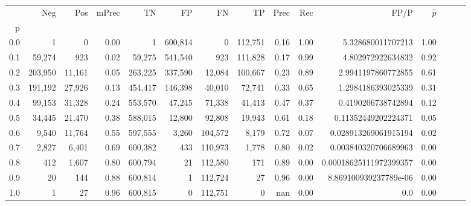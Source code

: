 \begin{tabular}{rrrrrrrrrrrrrrr}
\toprule
{} &      Neg &     Pos & mPrec &       TN &       FP &       FN &       TP &  Prec &   Rec &                    FP/P & $\hat{p}$ \\
p   &          &         &       &          &          &          &          &       &       &                         &           \\
\midrule
0.0 &        1 &       0 &  0.00 &        1 &  600,814 &        0 &  112,751 &  0.16 &  1.00 &       5.328680011707213 &      1.00 \\
0.1 &   59,274 &     923 &  0.02 &   59,275 &  541,540 &      923 &  111,828 &  0.17 &  0.99 &       4.802972922634832 &      0.92 \\
0.2 &  203,950 &  11,161 &  0.05 &  263,225 &  337,590 &   12,084 &  100,667 &  0.23 &  0.89 &      2.9941197860772855 &      0.61 \\
0.3 &  191,192 &  27,926 &  0.13 &  454,417 &  146,398 &   40,010 &   72,741 &  0.33 &  0.65 &      1.2984186393025339 &      0.31 \\
0.4 &   99,153 &  31,328 &  0.24 &  553,570 &   47,245 &   71,338 &   41,413 &  0.47 &  0.37 &      0.4190206738742894 &      0.12 \\
0.5 &   34,445 &  21,470 &  0.38 &  588,015 &   12,800 &   92,808 &   19,943 &  0.61 &  0.18 &     0.11352449202224371 &      0.05 \\
0.6 &    9,540 &  11,764 &  0.55 &  597,555 &    3,260 &  104,572 &    8,179 &  0.72 &  0.07 &    0.028913269061915194 &      0.02 \\
0.7 &    2,827 &   6,401 &  0.69 &  600,382 &      433 &  110,973 &    1,778 &  0.80 &  0.02 &    0.003840320706689963 &      0.00 \\
0.8 &      412 &   1,607 &  0.80 &  600,794 &       21 &  112,580 &      171 &  0.89 &  0.00 &  0.00018625111972399357 &      0.00 \\
0.9 &       20 &     144 &  0.88 &  600,814 &        1 &  112,724 &       27 &  0.96 &  0.00 &   8.869100939237789e-06 &      0.00 \\
1.0 &        1 &      27 &  0.96 &  600,815 &        0 &  112,751 &        0 &   nan &  0.00 &                     0.0 &      0.00 \\
\bottomrule
\end{tabular}
